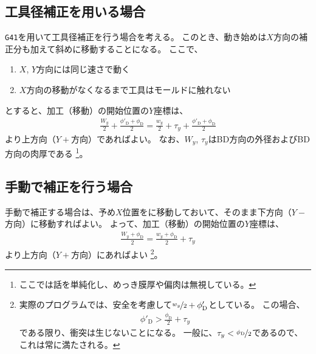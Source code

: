 \subsection{工具径補正を用いる場合}
\verb|G41|を用いて工具径補正を行う場合を考える。
このとき、動き始めは$X$方向の補正分も加えて斜めに移動することになる。
ここで、
\begin{enumerate}
\item $X$, $Y$方向には同じ速さで動く
\item $X$方向の移動がなくなるまで工具はモールドに触れない
\end{enumerate}
とすると、加工（移動）の開始位置の$Y$座標は、
\begin{align*}
  \frac{W_y}2+\frac{\phi'_\mathrm D+\phi_\mathrm D}2
  = \frac{w_y}2+\tau_y+\frac{\phi'_\mathrm D+\phi_\mathrm D}2
\end{align*}
より上方向（$Y+$方向）であればよい。
なお、$W_y$, $\tau_y$はBD方向の外径およびBD方向の肉厚である
\footnote{ここでは話を単純化し、めっき膜厚や偏肉は無視している。}。



\subsection{手動で補正を行う場合}
手動で補正する場合は、予め$X$位置をに移動しておいて、そのまま下方向（$Y-$方向）に移動すればよい。
よって、加工（移動）の開始位置の$Y$座標は、
\begin{align*}
  \frac{W_y+\phi_\mathrm D}2 = \frac{w_y+\phi_\mathrm D}2+\tau_y
\end{align*}
より上方向（$Y+$方向）にあればよい%
\footnote{実際のプログラムでは、安全を考慮して$\nicefrac{w_y}2+\phi'_\mathrm D$としている。
この場合、
\begin{align*}
  \phi'_\mathrm D > \frac{\phi_\mathrm D}2+\tau_y
\end{align*}
である限り、衝突は生じないことになる。
一般に、$\tau_y < \nicefrac{\phi_\mathrm D}2$であるので、これは常に満たされる。}。




